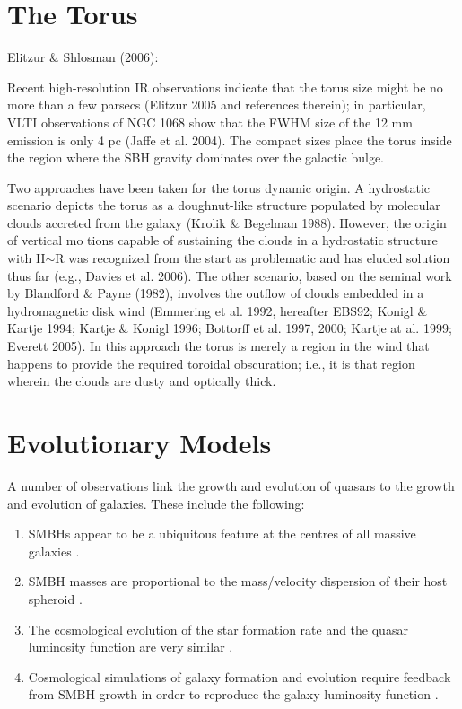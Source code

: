 \section{The Torus}

Elitzur \& Shlosman (2006): 

Recent high-resolution IR observations indicate that the torus size might be no more than a few parsecs (Elitzur 2005 and references therein); in particular, VLTI observations of NGC 1068 show that the FWHM size of the 12 mm emission is only 4 pc (Jaffe et al. 2004). The compact sizes place the torus inside the region where the SBH gravity dominates over the galactic bulge.

Two approaches have been taken for the torus dynamic origin. A hydrostatic scenario depicts the torus as a doughnut-like structure populated by molecular clouds accreted from the galaxy (Krolik \& Begelman 1988). However, the origin of vertical mo tions capable of sustaining the clouds in a hydrostatic structure with H$\sim$R was recognized from the start as problematic and has eluded solution thus far (e.g., Davies et al. 2006). The other
scenario, based on the seminal work by Blandford \& Payne (1982), involves the outflow of clouds embedded in a hydromagnetic disk wind (Emmering et al. 1992, hereafter EBS92; Konigl \& Kartje 1994; Kartje \& Konigl 1996; Bottorff et al. 1997, 2000; Kartje at al. 1999; Everett 2005). In this approach the torus is merely a region in the wind that happens to provide the required toroidal obscuration; i.e., it is that region wherein the clouds are dusty and optically thick.



\section{Evolutionary Models}

A number of observations link the growth and evolution of quasars to the growth and evolution of galaxies. These include the following: 

\begin{enumerate}
\item SMBHs appear to be a ubiquitous feature at the centres of all massive galaxies \citep[e.g.][]{kormendy13}. 
\item SMBH masses are proportional to the mass/velocity dispersion of their host spheroid \citep[the $M-\sigma$ relation;][]{ferrarese00,gebhardt00}.
\item The cosmological evolution of the star formation rate and the quasar luminosity function are very similar \citep[e.g.][]{wall05}.
\item Cosmological simulations of galaxy formation and evolution require feedback from SMBH growth in order to reproduce the galaxy luminosity function \citep{kauffmann00}.
\end{enumerate}

